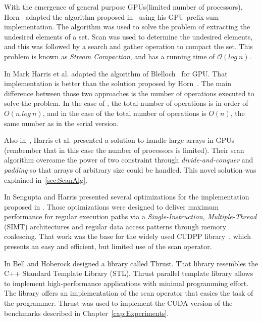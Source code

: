 \documentclass[Ingles]{ic-tese-v1}
\newcommand{\rcap}[1]{Chapter~\ref{cap:#1}}
\newcommand{\tit}[1]{{\textit{#1}}}
\begin{document}
With the emergence of general purpose GPUs(limited number of processors), Horn~\cite{GPUGems2} adapted the algorithm proposed in~\cite{dataparallel} using his GPU prefix sum implementation. The algorithm was used  to solve the problem of extracting the undesired elements of a set. Scan  was used to determine  the undesired elements, and this was followed by a search and  gather   operation  to   compact the set.  This   problem  is   known  as \textit{Stream   Compaction},  and has a running  time   of $\mathcal{O}(log\ n)$.

In \cite{harris2007parallel} Mark Harris  et al. adapted the algorithm of Blelloch~\cite{ScanAsPrimitive} for GPU. That  implementation is better than
the solution  proposed by Horn~\cite{GPUGems2}. The  main difference between those two approaches is the number of operations executed to
solve the problem. In the case of \cite{GPUGems2}, the total number of operations is in order of $O(n.log\ n)$, and in the case of \cite{harris2007parallel}
the  total number  of operations  is $O(n)$,  the same  number as  in the serial version.

Also in~\cite{harris2007parallel}, Harris et al. presented a solution  to handle large arrays in GPUs (rembember that in this case the 
number of processors is limited). Their scan algorithm overcame the power of two constraint through \tit{divide-and-conquer} and \tit{padding} 
so that arrays of arbitrary size could be handled. This novel solution was explained in~\ref{sec:ScanAlg}.

In   \cite{Sengupta:2008}  Sengupta and  Harris presented  several
optimizations     for      the     implementation      proposed     in
\cite{harris2007parallel}. Those  optimizations   were  designed  to
deliver  maximum  performance  for regular  execution  paths  via  a
\textit{Single-Instruction,  Multiple-Thread} (SIMT) architectures and
regular data access patterns through memory coalescing.  That work was
the  base  for  the  widely  used  CUDPP  library~\cite{CUDPP},  which
presents an easy and efficient, but limited use of the scan operator.

In  \cite{Nathan:2011} Bell  and  Hoberock designed  a library  called
Thrust.   That library  resembles  the C++  Standard Template  Library
(STL).   Thrust  parallel   template  library   allows  to   implement
high-performance  applications with  minimal  programming effort.  The
library offers an implementation of the scan operator that easies the task of
the programmer.  Thrust  was used  to implement  the CUDA version of the
benchmarks described in \rcap{Experiments}.
\end{document}
